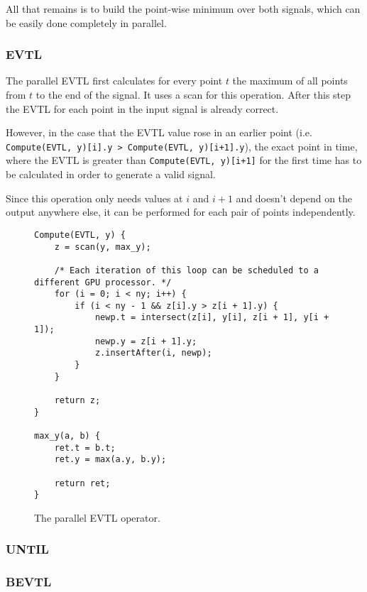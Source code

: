 \documentclass[a4paper,10pt]{article}
\begin{document}
All that remains is to build the point-wise minimum over both signals, which
can be easily done completely in parallel.

\subsubsection{EVTL}

The parallel EVTL first calculates for every point $t$ the maximum of all points from
$t$ to the end of the signal. It uses a scan for this operation. After this step the
EVTL for each point in the input signal is already correct.

However, in the case that the EVTL value rose in an earlier point (i.e.
\lstinline|Compute(EVTL, y)[i].y > Compute(EVTL, y)[i+1].y|), the exact point in time,
where the EVTL is greater than \lstinline|Compute(EVTL, y)[i+1]| for the first time
has to be calculated in order to generate a valid signal.

Since this operation only needs values at $i$ and $i + 1$ and doesn't depend on the
output anywhere else, it can be performed for each pair of points independently.

\begin{figure}[H]
\begin{lstlisting}
Compute(EVTL, y) {
    z = scan(y, max_y);

    /* Each iteration of this loop can be scheduled to a different GPU processor. */
    for (i = 0; i < ny; i++) {
        if (i < ny - 1 && z[i].y > z[i + 1].y) {
            newp.t = intersect(z[i], y[i], z[i + 1], y[i + 1]);
            newp.y = z[i + 1].y;
            z.insertAfter(i, newp);
        }
    }

    return z;
}

max_y(a, b) {
    ret.t = b.t;
    ret.y = max(a.y, b.y);

    return ret;
}
\end{lstlisting}
\label{fig:par_evtl}
\caption{The parallel EVTL operator.}
\end{figure}

\subsubsection{UNTIL}

\subsubsection{BEVTL}

\end{document}
